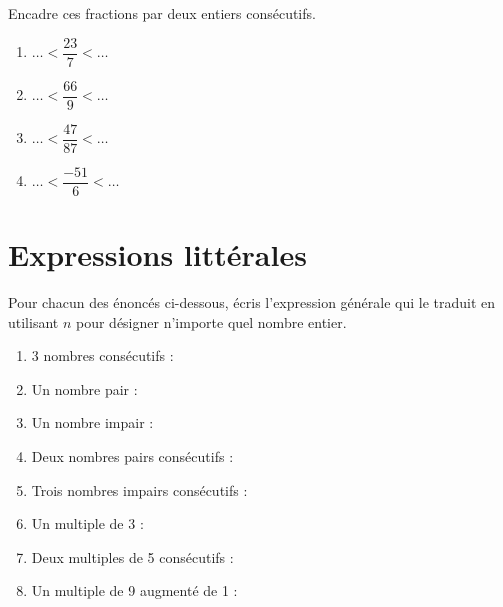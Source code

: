 \documentclass[../../syllabus_2.tex]{subfiles}
\begin{document}
\vfill

\begin{exercise}
    Encadre ces fractions par deux entiers consécutifs.
    \begin{enumerate}[cols=2]
        \item $ \dots < \dfrac{23}{7} < \dots $
        \item $ \dots < \dfrac{66}{9} < \dots $
        \item $ \dots < \dfrac{47}{87} < \dots $
        \item $ \dots < \dfrac{-51}{6} < \dots $
    \end{enumerate}
\end{exercise}

\newpage

\section{Expressions littérales}
Pour chacun des énoncés ci-dessous, écris l'expression générale qui le traduit en utilisant $n$ pour désigner n'importe quel nombre entier.
\begin{enumerate}[itemsep=1em]
    \item 3 nombres consécutifs :\dotfill
    \item Un nombre pair :\dotfill
    \item Un nombre impair :\dotfill
    \item Deux nombres pairs consécutifs :\dotfill
    \item Trois nombres impairs consécutifs :\dotfill
    \item Un multiple de 3 :\dotfill
    \item Deux multiples de 5 consécutifs :\dotfill
    \item Un multiple de 9 augmenté de 1 :\dotfill
\end{enumerate}
\end{document}
